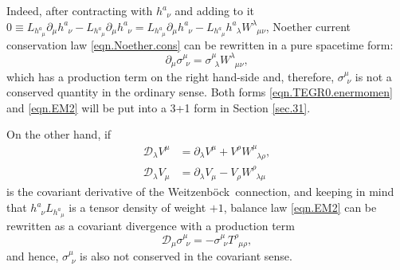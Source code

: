 \documentclass[
10pt, %
a4paper, %
oneside, %
twocolumn,
headinclude,footinclude, %
BCOR5mm, %
]{scrartcl}
\newcommand{\pd}[1]{\partial_{#1}}
\newcommand{\tetrsymbol}{h}
\newcommand{\tetr}[2]{\tetrsymbol^{#1}_{\phantom{#1}#2}}
\newcommand{\DW}[1]{\mathcal{D}_{#1}} %
\newcommand{\Tors}[2]{T^{#1}_{\phantom{#1}#2}}
\newcommand{\w}[2]{W^{#1}_{\phantom{#1}#2}}
\newcommand{\We}{Weitzenb\"ock}
\newcommand{\Laghodge}{L}%
\newcommand{\EMmat}[2]{\sigma^{#1}_{\ \,#2}}
\newcommand{\mat}[1]{\prescript{\text{(m)}}{}{\hspace{-0.1cm}#1}}
\newcommand{\gra}[1]{\prescript{\text{(g)}}{}{\hspace{-0.1cm}#1}}
\newcommand{\HDT}[1]{\accentset{\star}{T}^{#1}}
\begin{document}
	Indeed, after contracting with $ \tetr{a}{\nu} $ and adding to it $ 0\equiv
	\Laghodge_{\tetr{a}{\mu}}\pd{\mu} \tetr{a}{\nu} -
	\Laghodge_{\tetr{a}{\mu}}\pd{\mu} \tetr{a}{\nu}  =
	\Laghodge_{\tetr{a}{\mu}}\pd{\mu} \tetr{a}{\nu} - \Laghodge_{\tetr{a}{\mu}}
	\tetr{a}{\lambda}\w{\lambda}{\mu\nu} $, Noether current conservation law
	\eqref{eqn.Noether.cons} can be rewritten in a pure spacetime form:	
	\begin{equation}\label{eqn.EM2}
		\pd{\mu}\EMmat{\mu}{\nu} = \EMmat{\mu}{\lambda} 
		\w{\lambda}{\mu\nu},
	\end{equation}
	which has a production term on the right hand-side and, therefore, $
	\EMmat{\mu}{\nu} $ is not a conserved quantity in the ordinary sense.
	Both forms \eqref{eqn.TEGR0.enermomen} and \eqref{eqn.EM2} will be put into a 3+1 form in Section \ref{sec.31}.

	On the other hand, if 
	\begin{subequations}
		\begin{align}\label{eqn.cov.W}
			\DW{\lambda} V^{\mu} &= \pd{\lambda} V^\mu + V^\rho \w{\mu}{\lambda\rho}, 
			\\[2mm] 
			\DW{\lambda} V_{\mu} &= \pd{\lambda} V_\mu - V_\rho \w{\rho}{\lambda\mu}
		\end{align}
	\end{subequations}
	is the covariant derivative of the \We\ connection, and 
	keeping in mind that $ \tetr{a}{\nu}\Laghodge_{\tetr{a}{\mu}} $ is a tensor density of weight $ 
	+1 
	$, balance law \eqref{eqn.EM2} can be rewritten as a covariant divergence with a production term
	\begin{equation*}\label{eqn.EM.cov}
		\DW{\mu}\EMmat{\mu}{\nu} = -\EMmat{\mu}{\nu} \Tors{\rho}{\mu\rho},
	\end{equation*}
	and hence, $ \EMmat{\mu}{\nu} $ is also not conserved in the covariant sense.
	
	
\end{document}
